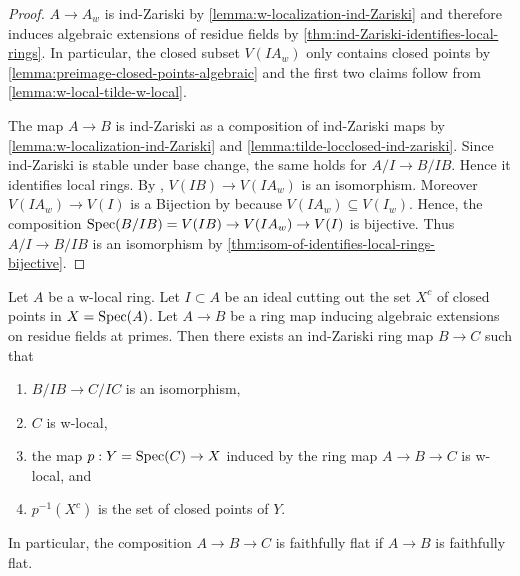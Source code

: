 \begin{proof}
    $A \to A_w$ is ind-Zariski by \ref{lemma:w-localization-ind-Zariski} and therefore induces
    algebraic extensions of residue fields by \ref{thm:ind-Zariski-identifies-local-rings}.
    In particular, the closed subset $V(I A_w)$ only contains
    closed points by \ref{lemma:preimage-closed-points-algebraic} and
    the first two claims follow from \ref{lemma:w-local-tilde-w-local}.

    The map $A \to B$ is ind-Zariski as a composition of ind-Zariski maps by
    \ref{lemma:w-localization-ind-Zariski} and \ref{lemma:tilde-locclosed-ind-zariski}.
    Since ind-Zariski is stable under base change, the same holds for $A/I \to B/IB$.
    Hence it identifies local rings. By ,
    $V(IB) \to V(I A_w)$ is an isomorphism. Moreover
    $V(I A_{w}) \to V(I)$ is a Bijection by 
    because $V(I A_{w}) \subseteq V(I_w)$. Hence, the composition
    $\mathrm{Spec}(B / IB) = V(IB) \to V(I A_w) \to V(I)$ is bijective. Thus
    $A / I \to B / IB$ is an isomorphism by \ref{thm:isom-of-identifies-local-rings-bijective}.
\end{proof}

\begin{lemma}
\label{thm:closed-points-isom-w-local}
Let $A$ be a w-local ring. Let $I \subset A$ be an ideal cutting out the set $X^c$ of closed points in $X = \operatorname{Spec} (A)$.
Let $A \to B$ be a ring map inducing algebraic extensions on residue fields at primes. Then
there exists an ind-Zariski ring map $B \to C$ such that
\begin{enumerate}
    \item $B/IB \to C/IC$ is an isomorphism, \label{item:quotinet-isom-closed-points-isom-w-local} %
    \item $C$ is w-local, \label{item:w-local-closed-points-isom-w-local}
    \item the map $p: Y = \operatorname{Spec} (C) \to X$ induced by the ring map $A \to B \to C$ is w-local, and %
    \item $p^{-1}(X^c)$ is the set of closed points of $Y$. \label{item:inverse-image-closed-points-isom-w-local}
\end{enumerate}
In particular, the composition $A \to B \to C$ is faithfully flat if $A \to B$ is faithfully flat.
\end{lemma}

